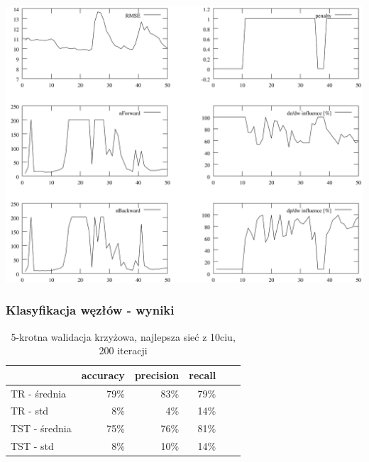 \documentclass{beamer}
\begin{document}
\begin{frame}
	\includegraphics[scale=0.065]{img/params_set6}
\end{frame}

\begin{frame}
\frametitle{Klasyfikacja węzłów - wyniki}
\setlength{\tabcolsep}{2pt}
\begin{table}[h!]
	\begin{center}
	\begin{tabular}{lrrrrr}
	\toprule
	& accuracy & precision & recall \\
	\midrule
	TR - średnia 	& 79\% & 83\% & 79\% \\
	TR - std 		& 8\% & 4\% & 14\% \\
	TST - średnia	& 75\% & 76\% & 81\% \\
	TST - std		& 8\% & 10\% & 14\% \\
	\bottomrule
	\end{tabular}
	\caption{5-krotna walidacja krzyżowa, najlepsza sieć z 10ciu, 200 iteracji}
	\end{center}
\end{table}
\end{frame}
\end{document}
